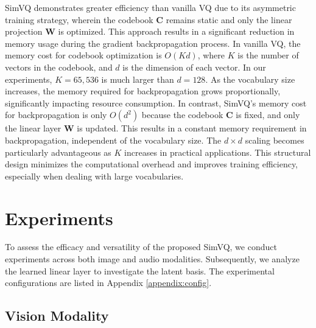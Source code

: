 SimVQ demonstrates greater efficiency than vanilla VQ due to its asymmetric training strategy, wherein the codebook $\bm{C}$ remains static and only the linear projection $\bm{W}$ is optimized. This approach results in a significant reduction in memory usage during the gradient backpropagation process. In vanilla VQ, the memory cost for codebook optimization is $O(Kd)$, where $K$ is the number of vectors in the codebook, and $d$ is the dimension of each vector. In our experiments, $K=65,536$ is much larger than $d=128$. As the vocabulary size increases, the memory required for backpropagation grows proportionally, significantly impacting resource consumption. In contrast, SimVQ’s memory cost for backpropagation is only $O(d^2)$ because the codebook $\bm{C}$ is fixed, and only the linear layer $\bm{W}$ is updated. This results in a constant memory requirement in backpropagation, independent of the vocabulary size. The $d \times d$ scaling becomes particularly advantageous as $K$ increases in practical applications. This structural design minimizes the computational overhead and improves training efficiency, especially when dealing with large vocabularies.



\section{Experiments}
To assess the efficacy and versatility of the proposed SimVQ, we conduct experiments across both image and audio modalities. Subsequently, we analyze the learned linear layer to investigate the latent basis. The experimental configurations are listed in Appendix \ref{appendix:config}.



\subsection{Vision Modality}



